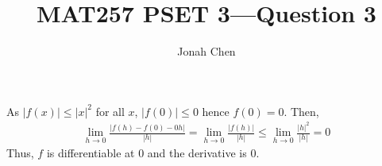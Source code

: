 \documentclass{exam}
\title{MAT257 PSET 3---Question 3}
\author{Jonah Chen}
\numberwithin{equation}{section}
\begin{document}
    \sffamily
    \maketitle
    As $|f(x)|\leq|x|^2$ for all $x$, $|f(0)|\leq 0$ hence $f(0)=0$. Then,
    \begin{align*}
        \lim_{h\to 0}\frac{|f(h)-f(0)-0h|}{|h|}=\lim_{h\to 0}\frac{|f(h)|}{|h|}\leq \lim_{h\to 0}\frac{|h|^2}{|h|}=0
    \end{align*}
    Thus, $f$ is differentiable at $0$ and the derivative is $0$.
\end{document}
